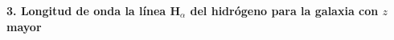 \textbf{3. Longitud de onda la línea H$_{\alpha}$ del hidrógeno para la galaxia
con $z$ mayor}

\vspace{20px}
